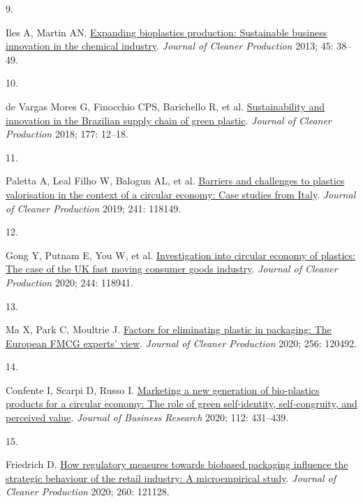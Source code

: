 \documentclass[
  12pt,
  a4paperpaper,
  onecolumn]{article}
\newlength{\cslhangindent}
\newlength{\csllabelwidth}
\newlength{\cslentryspacingunit} %
\newenvironment{CSLReferences}[2] %
 {%
  \setlength{\parindent}{0pt}
  \ifodd #1
  \let\oldpar\par
  \def\par{\hangindent=\cslhangindent\oldpar}
  \fi
  \setlength{\parskip}{#2\cslentryspacingunit}
 }%
 {}
\newcommand{\CSLLeftMargin}[1]{\parbox[t]{\csllabelwidth}{#1}}
\newcommand{\CSLRightInline}[1]{\parbox[t]{\linewidth - \csllabelwidth}{#1}\break}
\begin{document}
\begin{CSLReferences}{0}{0}
\leavevmode{}%
\CSLLeftMargin{9. }%
\CSLRightInline{Iles A, Martin AN.
\href{https://doi.org/10.1016/j.jclepro.2012.05.008}{Expanding
bioplastics production: Sustainable business innovation in the chemical
industry}. \emph{Journal of Cleaner Production} 2013; 45: 38--49.}

\leavevmode{}%
\CSLLeftMargin{10. }%
\CSLRightInline{de Vargas Mores G, Finocchio CPS, Barichello R, et al.
\href{https://doi.org/10.1016/j.jclepro.2017.12.138}{Sustainability and
innovation in the {Brazilian} supply chain of green plastic}.
\emph{Journal of Cleaner Production} 2018; 177: 12--18.}

\leavevmode{}%
\CSLLeftMargin{11. }%
\CSLRightInline{Paletta A, Leal Filho W, Balogun AL, et al.
\href{https://doi.org/10.1016/j.jclepro.2019.118149}{Barriers and
challenges to plastics valorisation in the context of a circular
economy: {Case} studies from {Italy}}. \emph{Journal of Cleaner
Production} 2019; 241: 118149.}

\leavevmode{}%
\CSLLeftMargin{12. }%
\CSLRightInline{Gong Y, Putnam E, You W, et al.
\href{https://doi.org/10.1016/j.jclepro.2019.118941}{Investigation into
circular economy of plastics: {The} case of the {UK} fast moving
consumer goods industry}. \emph{Journal of Cleaner Production} 2020;
244: 118941.}

\leavevmode{}%
\CSLLeftMargin{13. }%
\CSLRightInline{Ma X, Park C, Moultrie J.
\href{https://doi.org/10.1016/j.jclepro.2020.120492}{Factors for
eliminating plastic in packaging: {The European FMCG} experts' view}.
\emph{Journal of Cleaner Production} 2020; 256: 120492.}

\leavevmode{}%
\CSLLeftMargin{14. }%
\CSLRightInline{Confente I, Scarpi D, Russo I.
\href{https://doi.org/10.1016/j.jbusres.2019.10.030}{Marketing a new
generation of bio-plastics products for a circular economy: {The} role
of green self-identity, self-congruity, and perceived value}.
\emph{Journal of Business Research} 2020; 112: 431--439.}

\leavevmode{}%
\CSLLeftMargin{15. }%
\CSLRightInline{Friedrich D.
\href{https://doi.org/10.1016/j.jclepro.2020.121128}{How regulatory
measures towards biobased packaging influence the strategic behaviour of
the retail industry: {A} microempirical study}. \emph{Journal of Cleaner
Production} 2020; 260: 121128.}


\end{CSLReferences}
\end{document}
